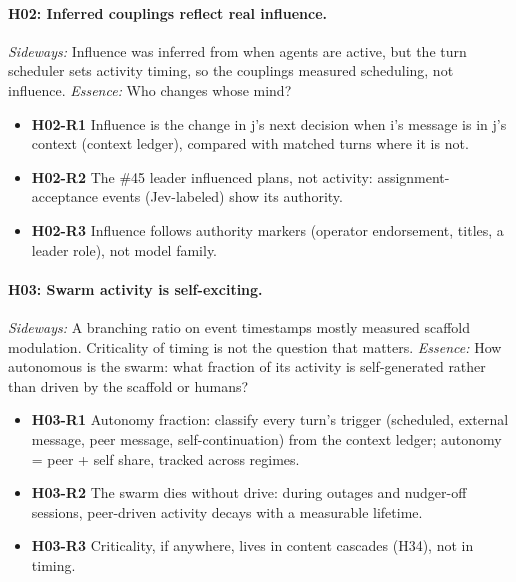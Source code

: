 \documentclass[aps,pre,reprint,10pt,nofootinbib]{revtex4-2}
\begin{document}
\paragraph{H02: Inferred couplings reflect real influence.} \emph{Sideways:} Influence was inferred from when agents are active, but the turn scheduler sets activity timing, so the couplings measured scheduling, not influence. \emph{Essence:} Who changes whose mind?
\begin{itemize}\setlength{\itemsep}{0pt}
\item \textbf{H02-R1} Influence is the change in j's next decision when i's message is in j's context (context ledger), compared with matched turns where it is not.
\item \textbf{H02-R2} The \#45 leader influenced plans, not activity: assignment-acceptance events (Jev-labeled) show its authority.
\item \textbf{H02-R3} Influence follows authority markers (operator endorsement, titles, a leader role), not model family.
\end{itemize}
\paragraph{H03: Swarm activity is self-exciting.} \emph{Sideways:} A branching ratio on event timestamps mostly measured scaffold modulation. Criticality of timing is not the question that matters. \emph{Essence:} How autonomous is the swarm: what fraction of its activity is self-generated rather than driven by the scaffold or humans?
\begin{itemize}\setlength{\itemsep}{0pt}
\item \textbf{H03-R1} Autonomy fraction: classify every turn's trigger (scheduled, external message, peer message, self-continuation) from the context ledger; autonomy = peer + self share, tracked across regimes.
\item \textbf{H03-R2} The swarm dies without drive: during outages and nudger-off sessions, peer-driven activity decays with a measurable lifetime.
\item \textbf{H03-R3} Criticality, if anywhere, lives in content cascades (H34), not in timing.
\end{itemize}
\end{document}
